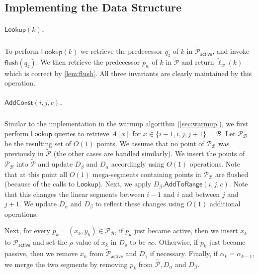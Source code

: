 \documentclass[10pt,a4paper]{article}
\newcommand{\AC}{\mathsf{AddConst}}
\newcommand{\AtR}{\mathsf{AddToRange}}
\newcommand{\Lookup}{\mathsf{Lookup}}
\renewcommand{\P}{\mathcal{P}}
\newcommand{\TAP}{\tilde{\P}_{\mathsf{active}}}
\newcommand{\DAL}{D_{\alpha}}
\newcommand{\Dbeta}{D_{\beta}}
\newcommand{\DGAM}{D_{\gamma}}
\newcommand{\tell}{\tilde{\ell}}
\newcommand{\TP}{\tilde{\P}}
\newcommand{\para}[1]{\vspace{-0.1in} \subparagraph*{#1}}
\newcommand{\B}{\mathcal{B}}
\newcommand{\rl}[1]{\rho_{#1}}
\newcommand{\flush}{\mathsf{flush}}
\begin{document}
\subsection{Implementing the Data Structure}

\subparagraph*{$\Lookup(k)$.} To perform $\Lookup(k)$ we retrieve the predecessor $q_z$ of $k$ in $\TAP$, and invoke $\flush(q_z)$. We then retrieve the predecessor $p_w$ of $k$ in $\TP$ and return $\tell_w(k)$ which is correct by \cref{lem:flush}. All three invariants are clearly maintained by this operation. 

\para{$\AC(i,j,c)$.}
Similar to the implementation in the warmup algorithm (\cref{sec:warmup}), we first perform $\Lookup$ queries to retrieve $A[x]$ for $x\in\{i-1,i,j,j+1\}=\B$. Let $\P_\B$ be the resulting set of $O(1)$ points. We assume that no point of $\P_\B$ was previously in $\TP$ (the other cases are handled similarly). 
We insert the points of $\P_\B$ into $\TP$ and update $\Dbeta$ and $\DAL$ accordingly using $O(1)$ operations. Note that at this point all $O(1)$ mega-segments containing points in $\P_\B$ are flushed (because of the calls to $\Lookup$). 
Next, we apply $\Dbeta.\AtR(i,j,c)$. 
Note that this changes the linear segments between $i-1$ and $i$ and between $j$ and $j+1$.
We update $\DAL$ and $\Dbeta$ to reflect these changes using $O(1)$ additional operations.

Next, 
for every $p_k = (x_k,y_k) \in \P_{\B}$, 
 if $p_k$ just became active, then we insert $x_k$ to $\TAP$  and set the $\rl{}$ value of $x_k$ in $D_\rho$ to be $\infty$. 
Otherwise, if $p_k$ just became passive, then we remove $x_k$ from $\TAP$ and $\DGAM$ if necessary.
Finally, if $\alpha_k=\alpha_{k-1}$, we merge the two segments by removing $p_k$ from $\TP, D_\alpha$ and $D_\beta$.
\end{document}

